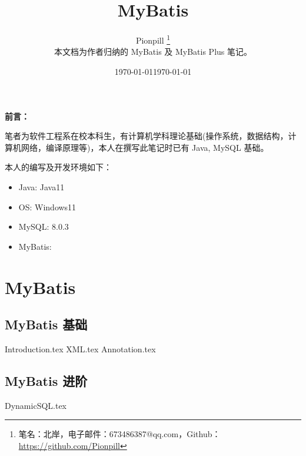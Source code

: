 \documentclass{PionpillNote-book}
\title{MyBatis}
\author{
    Pionpill \footnote{笔名：北岸，电子邮件：673486387@qq.com，Github：\url{https://github.com/Pionpill}} \\
    本文档为作者归纳的 MyBatis 及 MyBatis Plus 笔记。\\
}
\date{\today}
\begin{document}
\pagestyle{plain}
\maketitle

\noindent\textbf{前言：}

笔者为软件工程系在校本科生，有计算机学科理论基础(操作系统，数据结构，计算机网络，编译原理等)，本人在撰写此笔记时已有 Java, MySQL 基础。

本人的编写及开发环境如下：
\begin{itemize}
    \item Java: Java11
    \item OS: Windows11 
    \item MySQL: 8.0.3
    \item MyBatis: 
\end{itemize}

\date{\today}
\newpage

\tableofcontents

\newpage

\setcounter{page}{1} 
\pagestyle{fancy}

\part{MyBatis}
\chapter{MyBatis 基础}
{Introduction.tex}
{XML.tex}
{Annotation.tex}
\chapter{MyBatis 进阶}
{DynamicSQL.tex}
\end{document}
